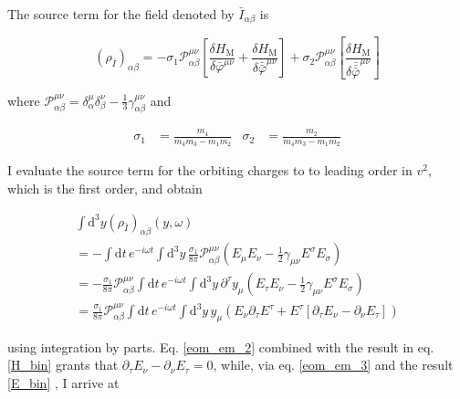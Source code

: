 \documentclass[11pt]{article}
\begin{document}
The source term for the field denoted by $\bar I_{\alpha \beta}$ is

\begin{equation}
	\left( \rho_{\bar I} \right)_{\alpha \beta}
	= -\sigma_{1}
	\mathcal{P}_{\alpha  \beta}^{\mu \nu}
	\left[ 
		\frac{
			\delta H_{\text{M}}
		}{
			\delta \bar{\varphi}^{\mu \nu}
		}
		+
		\frac{
			\delta H_{\text{M}}
		}{
			\delta \bar{\bar{\varphi}}^{\mu \nu}
		}
	\right]
	+ \sigma_2 
	\mathcal{P}_{\alpha  \beta}^{\mu \nu}
	\left[ 
		\frac{
			\delta H_{\text{M}}
		}{
			\delta \bar{\bar{\bar{\varphi}}}^{\mu \nu}
		}
	\right]
\end{equation}


where $\mathcal{P}_{\alpha  \beta}^{\mu \nu} = \delta^\mu_\alpha \delta^\nu_\beta - \frac{1}{3} \gamma_{\alpha \beta}^{\mu \nu}$ and

\begin{align}
	\sigma_1 &= \frac{m_4}{ m_4 m_3  - m_1 m_2} 
	&
	\sigma_2 &= \frac{m_2}{ m_4 m_3  - m_1 m_2}
\end{align}

I evaluate the source term for the orbiting charges to to leading order in $v^2$, which is the first order, and obtain

\begin{multline}
		\int \mathrm{d}^3 y \left( \rho_{\bar I} \right)_{\alpha \beta}
		\left( y, \omega \right)\\
		=
		- \int \mathrm{d} t \,e^{-i \omega t}
		\int \mathrm{d}^3 y\,
		\frac{\sigma_1}{8 \pi} \mathcal{P}^{\mu \nu}_{\alpha \beta}
		\left( 
		E_\mu E_\nu - \frac{1}{2} \gamma_{\mu \nu} E^\sigma E_\sigma
		\right)\\
		=
		- \frac{\sigma_1}{8 \pi} \mathcal{P}^{\mu \nu}_{\alpha \beta}
		\int \mathrm{d} t \,e^{-i \omega t}
		\int \mathrm{d}^3 y\,
		\partial^\tau y_\mu
		\left( 
		E_\tau E_\nu - \frac{1}{2} \gamma_{\mu \nu} E^\sigma E_\sigma 
		\right)\\
		=
		\frac{\sigma_1}{8 \pi} \mathcal{P}^{\mu \nu}_{\alpha \beta}
		\int \mathrm{d} t \,e^{-i \omega t}
		\int \mathrm{d}^3 y\,
		y_\mu
		\left(
		E_\nu \partial_\tau E^\tau
		+
		E^\tau \left[
		\partial_\tau E_\nu - \partial_\nu E_\tau
		\right]
		\right)
\end{multline}

using integration by parts. Eq. \ref{eom_em_2} combined with the result in eq. \ref{H_bin} grants that $ \partial_\tau E_\nu - \partial_\nu E_\tau = 0$, while, via eq. \ref{eom_em_3} and the result \ref{E_bin} , I arrive at
\end{document}
